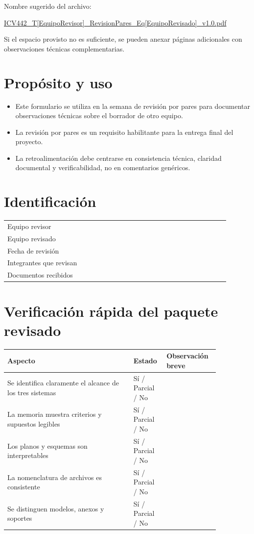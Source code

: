 \documentclass[11pt]{article}
\begin{document}

\begin{infobox}
Nombre sugerido del archivo:

\url{ICV442_T[EquipoRevisor]_RevisionPares_Eq[EquipoRevisado]_v1.0.pdf}

Si el espacio provisto no es suficiente, se pueden anexar p\'aginas adicionales con observaciones t\'ecnicas complementarias.
\end{infobox}

\section{Prop\'osito y uso}
\begin{itemize}
\item Este formulario se utiliza en la semana de revisi\'on por pares para documentar observaciones t\'ecnicas sobre el borrador de otro equipo.
\item La revisi\'on por pares es un requisito habilitante para la entrega final del proyecto.
\item La retroalimentaci\'on debe centrarse en consistencia t\'ecnica, claridad documental y verificabilidad, no en comentarios gen\'ericos.
\end{itemize}

\section{Identificaci\'on}
\begin{tabular}{p{0.32\linewidth} p{0.58\linewidth}}
\toprule
Equipo revisor & \\
Equipo revisado & \\
Fecha de revisi\'on & \\
Integrantes que revisan & \\
Documentos recibidos & \\
\bottomrule
\end{tabular}

\section{Verificaci\'on r\'apida del paquete revisado}
\begin{tabular}{p{0.54\linewidth} p{0.12\linewidth} p{0.20\linewidth}}
\toprule
\textbf{Aspecto} & \textbf{Estado} & \textbf{Observaci\'on breve} \\
\midrule
Se identifica claramente el alcance de los tres sistemas & S\'i / Parcial / No & \\
La memoria muestra criterios y supuestos legibles & S\'i / Parcial / No & \\
Los planos y esquemas son interpretables & S\'i / Parcial / No & \\
La nomenclatura de archivos es consistente & S\'i / Parcial / No & \\
Se distinguen modelos, anexos y soportes & S\'i / Parcial / No & \\
\bottomrule
\end{tabular}
\end{document}
